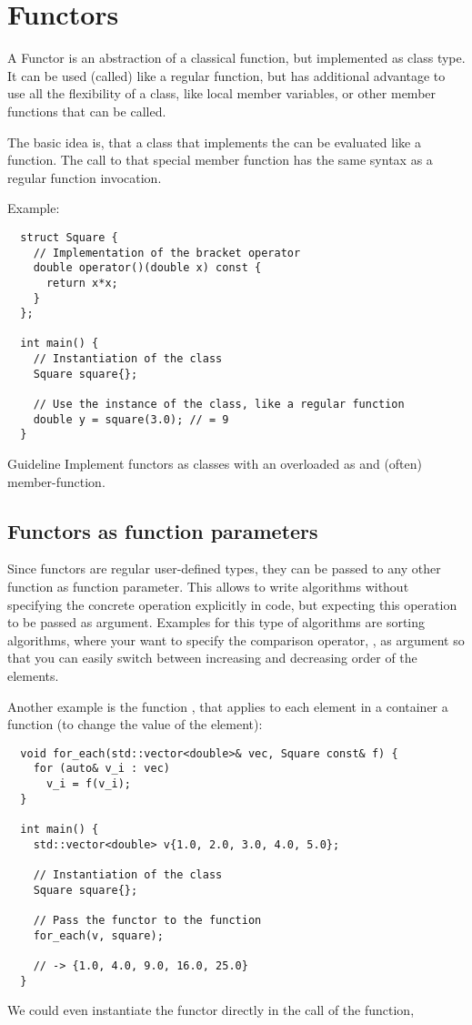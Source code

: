 \chapter{Functors}
A Functor is an abstraction of a classical function, but implemented as class type. It can be used (called) like a regular function, but has additional
advantage to use all the flexibility of a class, like local member variables, or other member functions that can be called.

The basic idea is, that a class that implements the  can be evaluated like a function. The call to that special member function has the same
syntax as a regular function invocation.

Example:
\begin{verbatim}
  struct Square {
    // Implementation of the bracket operator
    double operator()(double x) const {
      return x*x;
    }
  };

  int main() {
    // Instantiation of the class
    Square square{};

    // Use the instance of the class, like a regular function
    double y = square(3.0); // = 9
  }
\end{verbatim}

\begin{guideline}{Guideline}
  Implement functors as classes with an overloaded  as  and (often)  member-function.
\end{guideline}

\section{Functors as function parameters}
Since functors are regular user-defined types, they can be passed to any other function as function parameter. This allows to write algorithms
without specifying the concrete operation explicitly in code, but expecting this operation to be passed as argument. Examples for this type
of algorithms are sorting algorithms, where your want to specify the comparison operator, \eg {}, as argument so that you
can easily switch between increasing and decreasing order of the elements.

Another example is the function , that applies to each element in a container a function (\eg to change the value of the element):
\begin{verbatim}
  void for_each(std::vector<double>& vec, Square const& f) {
    for (auto& v_i : vec)
      v_i = f(v_i);
  }

  int main() {
    std::vector<double> v{1.0, 2.0, 3.0, 4.0, 5.0};

    // Instantiation of the class
    Square square{};

    // Pass the functor to the function
    for_each(v, square);

    // -> {1.0, 4.0, 9.0, 16.0, 25.0}
  }
\end{verbatim}
%
We could even instantiate the functor directly in the call of the  function, \ie
{}

